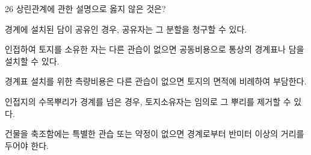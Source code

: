 \begin{question}{26}
상린관계에 관한 설명으로 옳지 않은 것은?
\begin{choices}
  \item 경계에 설치된 담이 공유인 경우, 공유자는 그 분할을 청구할 수 있다.
  \item 인접하여 토지를 소유한 자는 다른 관습이 없으면 공동비용으로 통상의 경계표나 담을 설치할 수 있다.
  \item 경계표 설치를 위한 측량비용은 다른 관습이 없으면 토지의 면적에 비례하여 부담한다.
  \item 인접지의 수목뿌리가 경계를 넘은 경우, 토지소유자는 임의로 그 뿌리를 제거할 수 있다.
  \item 건물을 축조함에는 특별한 관습 또는 약정이 없으면 경계로부터 반미터 이상의 거리를 두어야 한다.
\end{choices}
\end{question}
